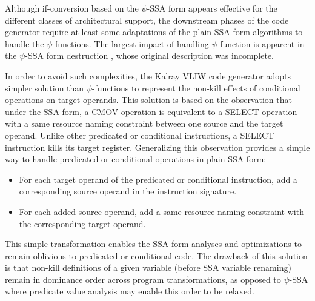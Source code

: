 \medskip
Although if-conversion based on the $\psi$-SSA form appears effective for the
different classes of architectural support, the downstream phases of the code
generator require at least some adaptations of the plain SSA form algorithms to
handle the $\psi$-functions. The largest impact of handling $\psi$-function is
apparent in the $\psi$-SSA form destruction \cite{Ferriere:2007:SCOPES}, whose
original description \cite{Stoutchinin:2001:MICRO} was incomplete.

In order to avoid such complexities, the Kalray VLIW code generator adopts
simpler solution than $\psi$-functions to represent the non-kill effects of
conditional operations on target operands.  This solution is based on the
observation that under the SSA form, a CMOV operation is equivalent to a SELECT
operation with a {same resource} naming constraint between one source and the
target operand. Unlike other predicated or conditional instructions, a SELECT
instruction kills its target register.  Generalizing this observation provides a
simple way to handle predicated or conditional operations in plain SSA form:
\begin{itemize}

\item For each target operand of the predicated or conditional instruction, add
a corresponding source operand in the instruction signature.

\item For each added source operand, add a {same resource} naming constraint
with the corresponding target operand.

\end{itemize}
This simple transformation enables the SSA form analyses and optimizations to
remain oblivious to predicated or conditional code. The drawback of this
solution is that non-kill definitions of a given variable (before SSA variable
renaming) remain in dominance order across program transformations, as opposed
to $\psi$-SSA where predicate value analysis may enable this order to be relaxed.

